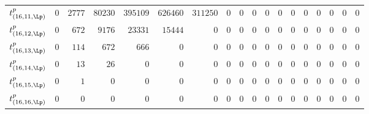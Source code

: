 \begin{tabular}{r|rrrrrrrrrrrrrrrrr}
  $t^{p}_{(16,11,\Lp)}$ & $0$ & $2777$ & $80230$ & $395109$ & $626460$ & $311250$ & $0$ & $0$ & $0$ & $0$ & $0$ & $0$ & $0$ & $0$ & $0$ & $0$ & $0$ \\
  $t^{p}_{(16,12,\Lp)}$ & $0$ & $672$ & $9176$ & $23331$ & $15444$ & $0$ & $0$ & $0$ & $0$ & $0$ & $0$ & $0$ & $0$ & $0$ & $0$ & $0$ & $0$ \\
  $t^{p}_{(16,13,\Lp)}$ & $0$ & $114$ & $672$ & $666$ & $0$ & $0$ & $0$ & $0$ & $0$ & $0$ & $0$ & $0$ & $0$ & $0$ & $0$ & $0$ & $0$ \\
  $t^{p}_{(16,14,\Lp)}$ & $0$ & $13$ & $26$ & $0$ & $0$ & $0$ & $0$ & $0$ & $0$ & $0$ & $0$ & $0$ & $0$ & $0$ & $0$ & $0$ & $0$ \\
  $t^{p}_{(16,15,\Lp)}$ & $0$ & $1$ & $0$ & $0$ & $0$ & $0$ & $0$ & $0$ & $0$ & $0$ & $0$ & $0$ & $0$ & $0$ & $0$ & $0$ & $0$ \\
  $t^{p}_{(16,16,\Lp)}$ & $0$ & $0$ & $0$ & $0$ & $0$ & $0$ & $0$ & $0$ & $0$ & $0$ & $0$ & $0$ & $0$ & $0$ & $0$ & $0$ & $0$ \\
\end{tabular}
